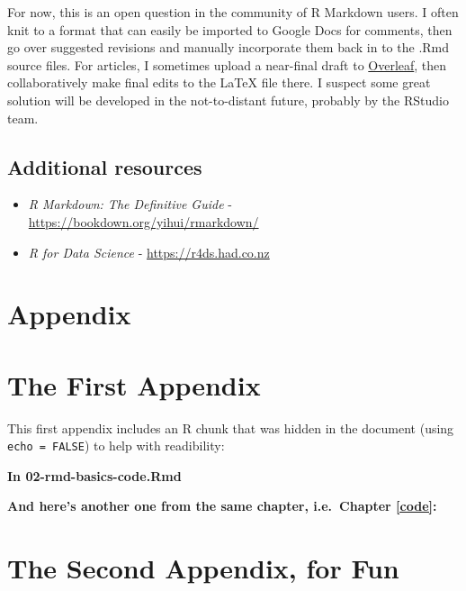 \documentclass[a4paper, nobind]{templates/ociamthesis}
\begin{document}
For now, this is an open question in the community of R Markdown users.
I often knit to a format that can easily be imported to Google Docs for comments, then go over suggested revisions and manually incorporate them back in to the .Rmd source files.
For articles, I sometimes upload a near-final draft to \href{https://www.overleaf.com/}{Overleaf}, then collaboratively make final edits to the LaTeX file there.
I suspect some great solution will be developed in the not-to-distant future, probably by the RStudio team.

\hypertarget{additional-resources}{%
\section{Additional resources}\label{additional-resources}}

\begin{itemize}
\item
  \emph{R Markdown: The Definitive Guide} - \url{https://bookdown.org/yihui/rmarkdown/}
\item
  \emph{R for Data Science} - \url{https://r4ds.had.co.nz}
\end{itemize}



\hypertarget{appendix}{%
\chapter*{Appendix}\label{appendix}}

\startappendices

\hypertarget{the-first-appendix}{%
\chapter{The First Appendix}\label{the-first-appendix}}

This first appendix includes an R chunk that was hidden in the document (using \texttt{echo\ =\ FALSE}) to help with readibility:

\textbf{In 02-rmd-basics-code.Rmd}

\textbf{And here's another one from the same chapter, i.e.~Chapter \ref{code}:}

\hypertarget{the-second-appendix-for-fun}{%
\chapter{The Second Appendix, for Fun}\label{the-second-appendix-for-fun}}
\end{document}
